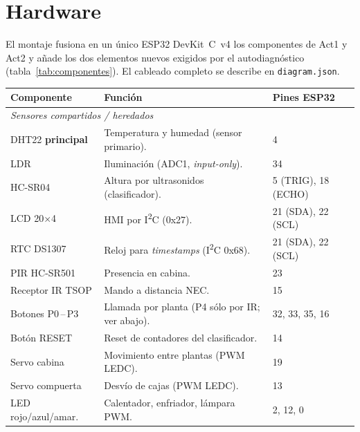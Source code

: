 \section{Hardware}
\label{sec:hardware}

El montaje fusiona en un único ESP32 DevKit~C~v4 los componentes de Act1 y
Act2 y añade los dos elementos nuevos exigidos por el autodiagnóstico
(tabla~\ref{tab:componentes}). El cableado completo se describe en
\texttt{diagram.json}.

\begin{table}[H]
  \centering
  \small
  \begin{tabular}{p{} p{} p{}}
    \toprule
    \textbf{Componente} & \textbf{Función} & \textbf{Pines ESP32} \\
    \midrule
    \multicolumn{3}{l}{\emph{Sensores compartidos / heredados}}\\
    DHT22 \textbf{principal} & Temperatura y humedad (sensor primario). & 4 \\
    LDR                  & Iluminación (ADC1, \emph{input-only}).         & 34 \\
    HC-SR04              & Altura por ultrasonidos (clasificador).        & 5 (TRIG), 18 (ECHO) \\
    LCD 20×4      & HMI por I\textsuperscript{2}C (0x27).          & 21 (SDA), 22 (SCL) \\
    RTC DS1307           & Reloj para \emph{timestamps} (I\textsuperscript{2}C 0x68). & 21 (SDA), 22 (SCL) \\
    PIR HC-SR501         & Presencia en cabina.                           & 23 \\
    Receptor IR TSOP     & Mando a distancia NEC.                         & 15 \\
    Botones P0\,--\,P3   & Llamada por planta (P4 sólo por IR; ver abajo).& 32, 33, 35, 16 \\
    Botón RESET          & Reset de contadores del clasificador.          & 14 \\
    Servo cabina         & Movimiento entre plantas (PWM LEDC).           & 19 \\
    Servo compuerta      & Desvío de cajas (PWM LEDC).                    & 13 \\
    LED rojo/azul/amar.  & Calentador, enfriador, lámpara PWM.            & 2, 12, 0 \\

\end{tabular}
\end{table}
